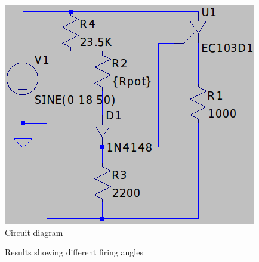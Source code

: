 \documentclass[journal]{IEEEtran}
\begin{document}
\begin{figure}[h]
	\centering
	\includegraphics[width=.6\linewidth]{./img/circuit.png}
	\caption{Circuit diagram}
	\label{fig:circuit}
\end{figure}

\begin{figure}
	\centering


	\caption{Results showing different firing angles}
	\label{fig:results}
\end{figure}
\end{document}
